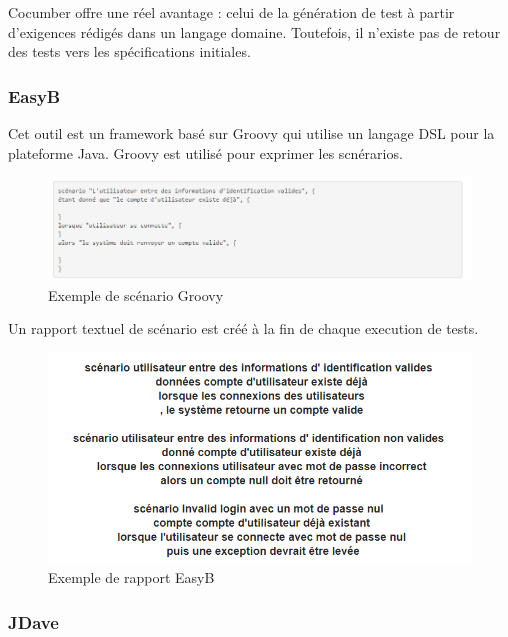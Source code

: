         Cocumber offre une réel avantage : celui de la génération de test à partir d'exigences rédigés dans un langage domaine. Toutefois, il n'existe pas de retour des tests vers les spécifications initiales.
        
        \subsubsection{EasyB}
        
        Cet outil est un framework basé sur Groovy qui utilise un langage DSL pour la plateforme Java. Groovy est utilisé pour exprimer les scnérarios.
            \begin{figure}[H]
                \centering
                \includegraphics[width=\textwidth]{images/easyB.PNG}
                \caption{Exemple de scénario Groovy}
            \end{figure}
        
        Un rapport textuel de scénario est créé à la fin de chaque execution de tests. 
            
            \begin{figure}[H]
                \centering
                \includegraphics[width=\textwidth]{images/rapportEasyB.PNG}
                \caption{Exemple de rapport EasyB}
            \end{figure}
        
        \subsubsection{JDave}
        
